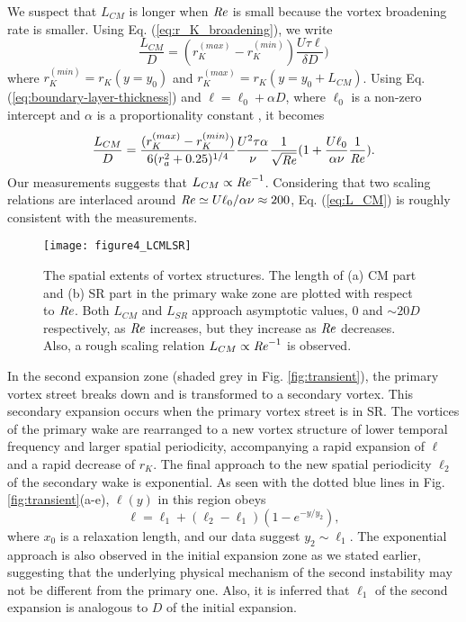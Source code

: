 \documentclass[english, aps, prl, longbibliography, preprint]{revtex4-1}
\newcommand\citepar\citep
\newcommand\Reynolds{{\it Re}}
\begin{document}
We suspect that $L_{CM}$ is longer when $\Reynolds$ is small because the vortex broadening rate is smaller.
Using Eq. (\ref{eq:r_K_broadening}), we write
\begin{equation}
\frac{L_{CM}}{D}=(r_K^{(max)}-r_K^{(min)})\frac{U\tau\ell}{\delta D}
\label{eq:L_CM_1})
\end{equation}
where $r_K^{(min)}=r_K(y=y_0)$ and $r_K^{(max)}=r_K(y=y_0+L_{CM})$.
Using Eq. (\ref{eq:boundary-layer-thickness}) and $\ell=\ell_0+\alpha D$, where $\ell_0$ is a non-zero intercept and $\alpha$ is a proportionality constant \citepar{Kim:2015jp}, it becomes
\begin{equation}
\frac{L_{CM}}{D}=\frac{(r_K^{(max)}-r_K^{(min)})}{6(r_a^2+0.25)^{1/4}} \frac{U^2\tau\alpha}{ \nu}  \frac{1}{\sqrt\Reynolds} (1+\frac{U\ell_0}{\alpha\nu}\frac{1}{\Reynolds}).
\label{eq:L_CM}
\end{equation}
Our measurements suggests that $L_{CM}\propto \Reynolds^{-1}$.
Considering that two scaling relations are interlaced around $\Reynolds\simeq U\ell_0/\alpha\nu \approx 200$, Eq. (\ref{eq:L_CM}) is roughly consistent with the measurements.

\begin{figure*}
\begin{centering}
\texttt{[image: figure4\_LCMLSR]}
\par
\end{centering}
\caption{
The spatial extents of vortex structures.
The length of (a) CM part and (b) SR part in the primary wake zone are plotted with respect to $\Reynolds$. 
Both $L_{CM}$ and $L_{SR}$ approach asymptotic values, 0 and $\sim 20D$ respectively, as $\Reynolds$ increases, but they increase as $\Reynolds$ decreases.
Also, a rough scaling relation $L_{CM}\propto \Reynolds^{-1}$ is observed.
\label{fig:spatial_extent}}
\end{figure*}

In the second expansion zone (shaded grey in Fig. \ref{fig:transient}), the primary vortex street breaks down and is transformed to a secondary vortex.
This secondary expansion occurs when the primary vortex street is in SR.
The vortices of the primary wake are rearranged to a new vortex structure of lower temporal frequency and larger spatial periodicity, accompanying a rapid expansion of $\ell$ and a rapid decrease of $r_K$.
The final approach to the new spatial periodicity $\ell_2$ of the secondary wake is exponential.
As seen with the dotted blue lines in Fig. \ref{fig:transient}(a-e), $\ell(y)$ in this region obeys
\begin{equation}
\ell=\ell_{1}+\left(\ell_{2}-\ell_{1}\right)\left(1-e^{-y/y_{2}}\right),
\label{eq:exponential_expansion}
\end{equation}
where $x_{0}$ is a relaxation length, and our data suggest $y_{2}\sim\ell_{1}$.
The exponential approach is also observed in the initial expansion zone as we stated earlier, suggesting that the underlying physical mechanism of the second instability may not be different from the primary one.
Also, it is inferred that $\ell_1$ of the second expansion is analogous to $D$ of the initial expansion.
\end{document}
